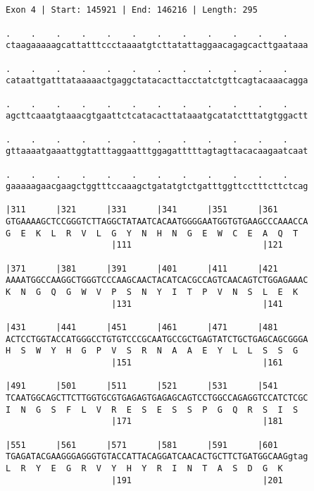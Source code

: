 \documentclass{article}
\begin{document}
\begin{Verbatim}
                                                      
 
Exon 4 | Start: 145921 | End: 146216 | Length: 295
 
.    .    .    .    .    .    .    .    .    .    .    .    
ctaagaaaaagcattatttccctaaaatgtcttatattaggaacagagcacttgaataaa
                                                            
.    .    .    .    .    .    .    .    .    .    .    .    
cataattgatttataaaaactgaggctatacacttacctatctgttcagtacaaacagga
                                                            
.    .    .    .    .    .    .    .    .    .    .    .    
agcttcaaatgtaaacgtgaattctcatacacttataaatgcatatctttatgtggactt
                                                            
.    .    .    .    .    .    .    .    .    .    .    .    
gttaaaatgaaattggtatttaggaatttggagatttttagtagttacacaagaatcaat
                                                            
.    .    .    .    .    .    .    .    .    .    .    .    
gaaaaagaacgaagctggtttccaaagctgatatgtctgatttggttcctttcttctcag
                                                            
|311      |321      |331      |341      |351      |361      
GTGAAAAGCTCCGGGTCTTAGGCTATAATCACAATGGGGAATGGTGTGAAGCCCAAACCA
G  E  K  L  R  V  L  G  Y  N  H  N  G  E  W  C  E  A  Q  T  
                     |111                          |121     
  
|371      |381      |391      |401      |411      |421      
AAAATGGCCAAGGCTGGGTCCCAAGCAACTACATCACGCCAGTCAACAGTCTGGAGAAAC
K  N  G  Q  G  W  V  P  S  N  Y  I  T  P  V  N  S  L  E  K  
                     |131                          |141     
  
|431      |441      |451      |461      |471      |481      
ACTCCTGGTACCATGGGCCTGTGTCCCGCAATGCCGCTGAGTATCTGCTGAGCAGCGGGA
H  S  W  Y  H  G  P  V  S  R  N  A  A  E  Y  L  L  S  S  G  
                     |151                          |161     
  
|491      |501      |511      |521      |531      |541      
TCAATGGCAGCTTCTTGGTGCGTGAGAGTGAGAGCAGTCCTGGCCAGAGGTCCATCTCGC
I  N  G  S  F  L  V  R  E  S  E  S  S  P  G  Q  R  S  I  S  
                     |171                          |181     
  
|551      |561      |571      |581      |591      |601      
TGAGATACGAAGGGAGGGTGTACCATTACAGGATCAACACTGCTTCTGATGGCAAGgtag
L  R  Y  E  G  R  V  Y  H  Y  R  I  N  T  A  S  D  G  K     
                     |191                          |201     
  

\end{Verbatim}
\end{document}
